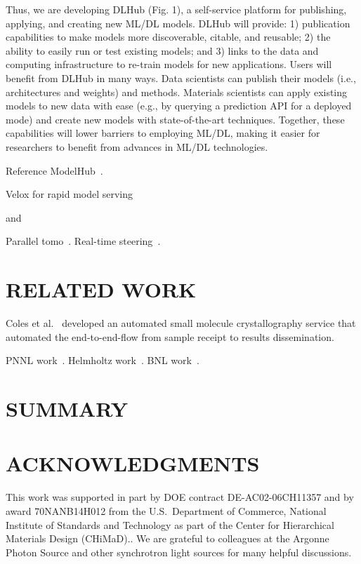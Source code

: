 \documentclass{aip-cp}
\begin{document}
Thus, we are developing DLHub (Fig. 1), a self-service platform for publishing, applying, and creating new ML/DL models. DLHub will provide: 1) publication capabilities to make models more discoverable, citable, and reusable; 2) the ability to easily run or test existing models; and 3) links to the data and computing infrastructure to re-train models for new applications. Users will benefit from DLHub in many ways. Data scientists can publish their models (i.e., architectures and weights) and methods. Materials scientists can apply existing models to new data with ease (e.g., by querying a prediction API for a deployed mode) and create new models with state-of-the-art techniques. Together, these capabilities will lower barriers to employing ML/DL, making it easier for researchers to benefit from advances in ML/DL technologies. 

Reference ModelHub~\cite{miao2017towards}. 


Velox for rapid model serving~\cite{crankshaw2014missing}

and~\cite{kumar2017data}


Parallel tomo~\cite{Bicer_Europar15}. Real-time steering~\cite{bicer2017real}.

\section{RELATED WORK}

Coles et al.~\cite{coles2005ecses,coles2006science} developed an automated small molecule crystallography service that automated the
end-to-end-flow from sample receipt to results dissemination.

PNNL work~\cite{thomas2015towards}. Helmholtz work~\cite{gehrke2015high}. BNL work~\cite{deslippe2014workflow}.


\section{SUMMARY}









\section{ACKNOWLEDGMENTS}

This work was supported in part by DOE contract DE-AC02-06CH11357 and by award 70NANB14H012 from the U.S.\  Department of Commerce, National Institute of Standards and Technology as part of the Center for Hierarchical Materials Design (CHiMaD)..
We are grateful to colleagues at the Argonne Photon Source and other synchrotron light sources
for many helpful discussions.


\nocite{*}
%
%
\end{document}
